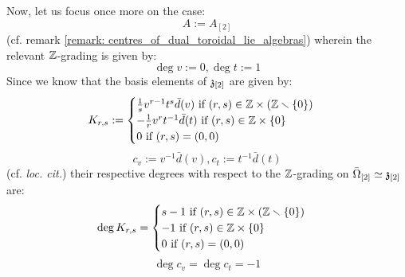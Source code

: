 \begin{remark}
            Now, let us focus once more on the case:
                $$A := A_{[2]}$$
            (cf. remark \ref{remark: centres_of_dual_toroidal_lie_algebras}) wherein the relevant $\mathbb{Z}$-grading is given by:
                $$\deg v := 0, \deg t := 1$$
            Since we know that the basis elements of $\mathfrak{z}_{[2]}$ are given by:
                $$
                    K_{r, s} :=
                    \begin{cases}
                        \text{$\frac1s v^{r - 1} t^s \bar{d}(v)$ if $(r, s) \in \Z \x (\Z \setminus \{0\})$}
                        \\
                        \text{$-\frac1r v^r t^{-1} \bar{d}(t)$ if $(r, s) \in \Z \x \{0\}$}
                        \\
                        \text{$0$ if $(r, s) = (0, 0)$}
                    \end{cases}
                $$
                $$c_v := v^{-1} \bar{d}(v), c_t := t^{-1} \bar{d}(t)$$
            (cf. \textit{loc. cit.}) their respective degrees with respect to the $\mathbb{Z}$-grading on $\bar{\Omega}_{[2]} \simeq \mathfrak{z}_{[2]}$ are:
                $$
                    \deg K_{r, s} =
                    \begin{cases}
                        \text{$s - 1$ if $(r, s) \in \Z \x (\Z \setminus \{0\})$}
                        \\
                        \text{$-1$ if $(r, s) \in \Z \x \{0\}$}
                        \\
                        \text{$0$ if $(r, s) = (0, 0)$}
                    \end{cases}
                $$
                $$\deg c_v = \deg c_t = -1$$
        \end{remark}

